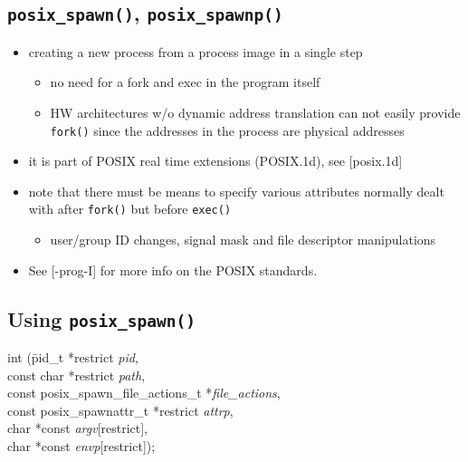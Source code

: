 \subsection{\texttt{posix\_spawn()}, \texttt{posix\_spawnp()}}

\begin{itemize}
\item creating a new process from a process image in a single step
	\begin{itemize}
	\item no need for a fork and exec in the program itself
	\item HW architectures w/o dynamic address translation can not easily
	provide \texttt{fork()} since the addresses in the process are physical
	addresses
	\end{itemize}
\item it is part of POSIX real time extensions (POSIX.1d), see [posix.1d]
\item note that there must be means to specify various attributes normally dealt
with after \texttt{fork()} but before \texttt{exec()}
	\begin{itemize}
	\item user/group ID changes, signal mask and file descriptor
	manipulations
	\end{itemize}
\end{itemize}

\begin{itemize}
\item See [\myun\myix-prog-I] for more info on the POSIX standards.
\end{itemize}

\subsection{Using \texttt{posix\_spawn()}}

\begin{tabbing}
int (\=pid\_t *restrict \emph{pid},\\
		\>const char *restrict \emph{path},\\
		\>const posix\_spawn\_file\_actions\_t *\emph{file\_actions},\\
		\>const posix\_spawnattr\_t *restrict \emph{attrp},\\
		\>char *const \emph{argv}[restrict],\\
		\>char *const \emph{envp}[restrict]);
\end{tabbing}

